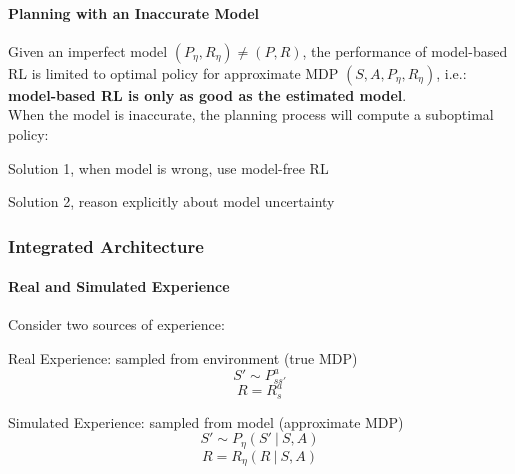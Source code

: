 \documentclass[10pt]{report}
\begin{document}
\paragraph{Planning with an Inaccurate Model} Given an imperfect model $(P_\eta, R_\eta)\neq (P,R)$, the performance of model-based RL is limited to optimal policy for approximate MDP $(S,A,P_\eta,R_\eta)$, i.e.: \textbf{model-based RL is only as good as the estimated model}.\\
When the model is inaccurate, the planning process will compute a suboptimal policy:
\begin{list}{}{}
	\item Solution 1, when model is wrong, use model-free RL
	\item Solution 2, reason explicitly about model uncertainty
\end{list}
\pagebreak
\subsubsection{Integrated Architecture}
\paragraph{Real and Simulated Experience} Consider two sources of experience:
\begin{list}{}{}
	\item Real Experience: sampled from environment (true MDP)
	$$S'\sim P_{ss'}^a$$
	$$R = R_s^a$$
	\item Simulated Experience: sampled from model (approximate MDP)
	$$S'\sim P_\eta(S'\:|\:S,A)$$
	$$R = R_\eta(R\:|\:S,A)$$
\end{list}
\end{document}

